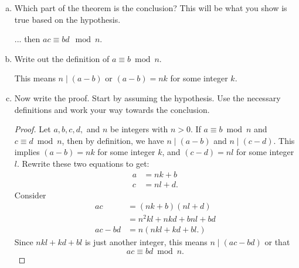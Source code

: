 \documentclass[12pt]{amsart}
\theoremstyle{plain}
\theoremstyle{definition}
\begin{document}
\begin{enumerate}[1.]
\begin{enumerate}[a.]
\begin{framed}
		\end{framed}
		\item Which part of the theorem is the conclusion? This will be what you show is true based on the hypothesis.
		\begin{framed}
		... then $ac \equiv bd \mod n$.
		\end{framed}
		\item Write out the definition of $a \equiv b \bmod n$.
		\begin{framed}
		This means $n \mid (a-b)$ or $(a-b) = nk$ for some integer $k$.
		\end{framed}
		\item Now write the proof.  Start by assuming the hypothesis.  Use the necessary definitions and work your way towards the conclusion.
		\begin{framed}
		\begin{proof}Let $a,b,c,d,$ and $n$ be integers with $n > 0$.  If $a \equiv b \bmod n$ and $c \equiv d \bmod n$, then by definition, we have $n \mid (a-b)$ and $n \mid (c-d)$.  This implies $(a-b) = nk$ for some integer $k$, and $(c-d) = nl$ for some integer $l$.  Rewrite these two equations to get:
		\begin{align*}
		a &= nk+b\\
		c &= nl + d.
		\end{align*}
		Consider
		\begin{align*}
		ac &= (nk+b)(nl+d)\\
		&= n^2kl+nkd+bnl+bd\\
		ac - bd &= n(nkl+kd+bl.)
		\end{align*} 
		Since $nkl+kd+bl$ is just another integer, this means $n \mid (ac-bd)$ or that $$ac \equiv bd \bmod n.$$
		\end{proof}
		\end{framed}
	\end{enumerate}
\end{enumerate}
\end{document}
